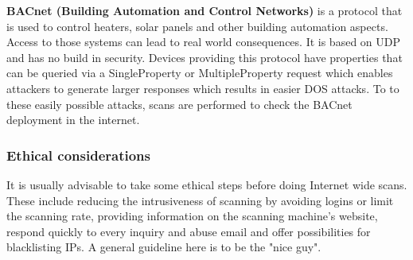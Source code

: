 \textbf{BACnet (Building Automation and Control Networks)} is a protocol that is used to control heaters, solar panels and other building automation aspects.
Access to those systems can lead to real world consequences.
It is based on UDP and has no build in security.
Devices providing this protocol have properties that can be queried via a SingleProperty or MultipleProperty request which enables attackers to generate larger responses which results in easier DOS attacks.
To to these easily possible attacks, scans are performed to check the BACnet deployment in the internet.

\subsubsection*{Ethical considerations}
It is usually advisable to take some ethical steps before doing Internet wide scans.
These include reducing the intrusiveness of scanning by avoiding logins or limit the scanning rate, providing information on the scanning machine's website, respond quickly to every inquiry and abuse email and offer possibilities for blacklisting IPs.
A general guideline here is to be the "nice guy".
